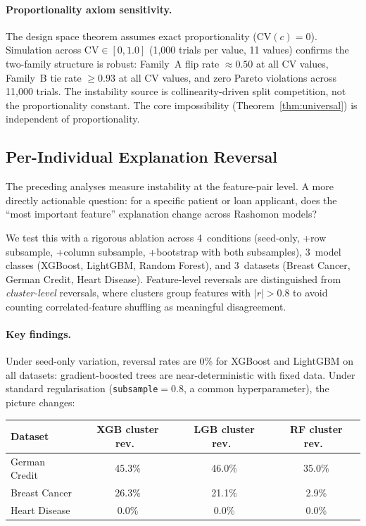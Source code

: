 \documentclass[11pt,a4paper]{article}
\begin{document}
\paragraph{Proportionality axiom sensitivity.}
The design space theorem assumes exact proportionality ($\text{CV}(c) = 0$). Simulation across $\text{CV} \in [0, 1.0]$ (1{,}000 trials per value, 11 values) confirms the two-family structure is robust: Family~A flip rate $\approx 0.50$ at all CV values, Family~B tie rate $\geq 0.93$ at all CV values, and zero Pareto violations across 11{,}000 trials. The instability source is collinearity-driven split competition, not the proportionality constant. The core impossibility (Theorem~\ref{thm:universal}) is independent of proportionality.

\subsection{Per-Individual Explanation Reversal}
\label{sec:individual-reversal}

The preceding analyses measure instability at the feature-pair level. A more directly actionable question: for a specific patient or loan applicant, does the ``most important feature'' explanation change across Rashomon models?

We test this with a rigorous ablation across 4~conditions (seed-only, +row subsample, +column subsample, +bootstrap with both subsamples), 3~model classes (XGBoost, LightGBM, Random Forest), and 3~datasets (Breast Cancer, German Credit, Heart Disease). Feature-level reversals are distinguished from \emph{cluster-level} reversals, where clusters group features with $|r| > 0.8$ to avoid counting correlated-feature shuffling as meaningful disagreement.

\paragraph{Key findings.}
Under seed-only variation, reversal rates are 0\% for XGBoost and LightGBM on all datasets: gradient-boosted trees are near-deterministic with fixed data. Under standard regularisation (\texttt{subsample}${}= 0.8$, a common hyperparameter), the picture changes:

\begin{center}
\small
\begin{tabular}{lccc}
\toprule
Dataset & XGB cluster rev.\ & LGB cluster rev.\ & RF cluster rev.\ \\
\midrule
German Credit   & 45.3\% & 46.0\% & 35.0\% \\
Breast Cancer   & 26.3\% & 21.1\% & 2.9\% \\
Heart Disease   & 0.0\%  & 0.0\%  & 0.0\% \\
\bottomrule
\end{tabular}
\end{center}
\end{document}
